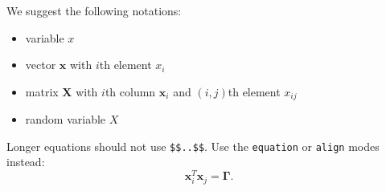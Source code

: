 \documentclass{article}
\renewcommand{\vec}[1]{\mathbold{#1}}
\newcommand{\mat}[1]{\mathbold{#1}}
\newcommand{\vx}{\vec{x}}
\newcommand{\vGamma}{\mat{\Gamma}}
\newcommand{\vX}{\mat{X}}
\begin{document}
We suggest the following notations:
\begin{itemize}
\item variable \(x\) 
\item vector \(\vx\) with \(i\)th element \(x_i\)
\item matrix \(\vX\) with \(i\)th column \(\vx_i\) and \((i,j)\)th element \(x_{ij}\)
\item random variable \(X\)
\end{itemize}

Longer equations should not use \texttt{\$\$..\$\$}.
Use the \texttt{equation} or \texttt{align} modes instead:
\begin{equation*}
\vx_i^T \vx_j = \vGamma.
\end{equation*}
\end{document}
